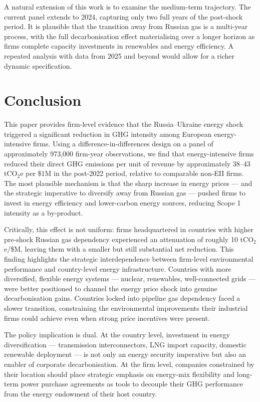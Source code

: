 \documentclass[12pt,a4paper]{article}
\begin{document}
A natural extension of this work is to examine the medium-term trajectory. The current panel extends to 2024, capturing only two full years of the post-shock period. It is plausible that the transition away from Russian gas is a multi-year process, with the full decarbonisation effect materialising over a longer horizon as firms complete capacity investments in renewables and energy efficiency. A repeated analysis with data from 2025 and beyond would allow for a richer dynamic specification.

\section{Conclusion}
\label{sec:conclusion}

This paper provides firm-level evidence that the Russia–Ukraine energy shock triggered a significant reduction in GHG intensity among European energy-intensive firms. Using a difference-in-differences design on a panel of approximately 973,000 firm-year observations, we find that energy-intensive firms reduced their direct GHG emissions per unit of revenue by approximately 38--43 tCO$_2$e per \$1M in the post-2022 period, relative to comparable non-EII firms. The most plausible mechanism is that the sharp increase in energy prices — and the strategic imperative to diversify away from Russian gas — pushed firms to invest in energy efficiency and lower-carbon energy sources, reducing Scope 1 intensity as a by-product.

Critically, this effect is not uniform: firms headquartered in countries with higher pre-shock Russian gas dependency experienced an attenuation of roughly 10 tCO$_2$e/\$M, leaving them with a smaller but still substantial net reduction. This finding highlights the strategic interdependence between firm-level environmental performance and country-level energy infrastructure. Countries with more diversified, flexible energy systems — nuclear, renewables, well-connected grids — were better positioned to channel the energy price shock into genuine decarbonisation gains. Countries locked into pipeline gas dependency faced a slower transition, constraining the environmental improvements their industrial firms could achieve even when strong price incentives were present.

The policy implication is dual. At the country level, investment in energy diversification — transmission interconnectors, LNG import capacity, domestic renewable deployment — is not only an energy security imperative but also an enabler of corporate decarbonisation. At the firm level, companies constrained by their location should place strategic emphasis on energy-mix flexibility and long-term power purchase agreements as tools to decouple their GHG performance from the energy endowment of their host country.




\end{document}
